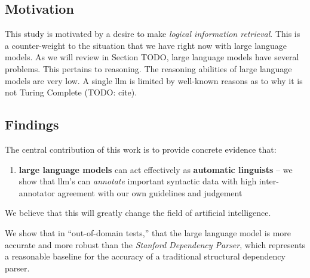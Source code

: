 \label{sec:contributions}

\subsection{Motivation}
This study is motivated by a desire to make {\em logical information retrieval}.
This is a counter-weight to the situation that we have right now with large language models.
As we will review in Section TODO, large language models have several problems.
This pertains to reasoning.
The reasoning abilities of large language models are very low.
A single llm is limited by well-known reasons as to why it is not Turing Complete (TODO: cite).


\subsection{Findings}
The central contribution of this work is to provide concrete evidence that:
\begin{enumerate}
    \item {\bf large language models} can act effectively as {\bf automatic linguists} -- we show that llm's can {\em annotate} important syntactic data with high inter-annotator agreement with our own guidelines and judgement
\end{enumerate}
We believe that this will greatly change the field of artificial intelligence.

We show that in ``out-of-domain tests,'' that the large language model is more accurate and more robust than the {\em Stanford Dependency Parser}, which represents a reasonable baseline for the accuracy of a traditional structural dependency parser.

